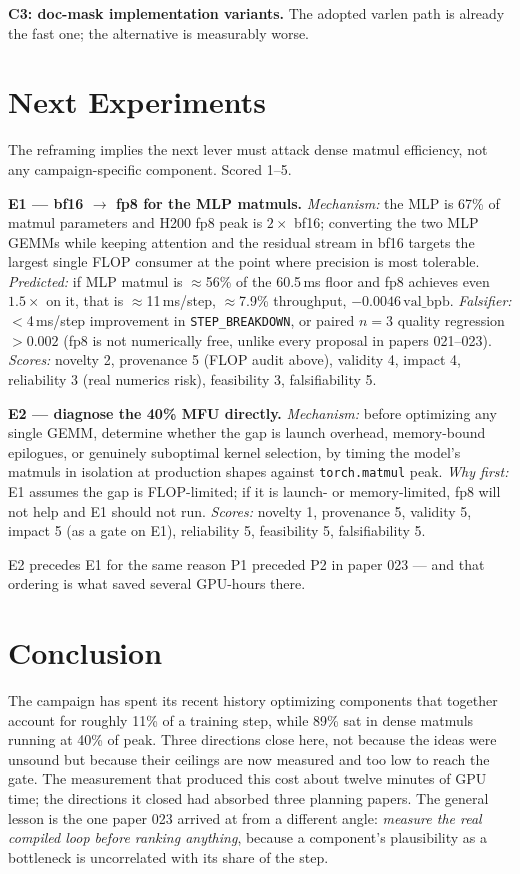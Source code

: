 \documentclass{article}
\newcommand{\vb}{\mathrm{val\_bpb}}
\begin{document}
\textbf{C3: doc-mask implementation variants.} The adopted varlen path is already the fast one; the alternative is measurably worse.

\section{Next Experiments}
The reframing implies the next lever must attack dense matmul efficiency, not any campaign-specific component. Scored 1--5.

\textbf{E1 --- bf16 $\to$ fp8 for the MLP matmuls.} \emph{Mechanism:} the MLP is 67\% of matmul parameters and H200 fp8 peak is $2\times$ bf16; converting the two MLP GEMMs while keeping attention and the residual stream in bf16 targets the largest single FLOP consumer at the point where precision is most tolerable. \emph{Predicted:} if MLP matmul is $\approx$56\% of the 60.5\,ms floor and fp8 achieves even $1.5\times$ on it, that is $\approx$11\,ms/step, $\approx$7.9\% throughput, $-0.0046$\,$\vb$. \emph{Falsifier:} $<$4\,ms/step improvement in \texttt{STEP\_BREAKDOWN}, or paired $n{=}3$ quality regression $>0.002$ (fp8 is not numerically free, unlike every proposal in papers 021--023). \emph{Scores:} novelty 2, provenance 5 (FLOP audit above), validity 4, impact 4, reliability 3 (real numerics risk), feasibility 3, falsifiability 5.

\textbf{E2 --- diagnose the 40\% MFU directly.} \emph{Mechanism:} before optimizing any single GEMM, determine whether the gap is launch overhead, memory-bound epilogues, or genuinely suboptimal kernel selection, by timing the model's matmuls in isolation at production shapes against \texttt{torch.matmul} peak. \emph{Why first:} E1 assumes the gap is FLOP-limited; if it is launch- or memory-limited, fp8 will not help and E1 should not run. \emph{Scores:} novelty 1, provenance 5, validity 5, impact 5 (as a gate on E1), reliability 5, feasibility 5, falsifiability 5.

E2 precedes E1 for the same reason P1 preceded P2 in paper 023 --- and that ordering is what saved several GPU-hours there.

\section{Conclusion}
The campaign has spent its recent history optimizing components that together account for roughly 11\% of a training step, while 89\% sat in dense matmuls running at 40\% of peak. Three directions close here, not because the ideas were unsound but because their ceilings are now measured and too low to reach the gate. The measurement that produced this cost about twelve minutes of GPU time; the directions it closed had absorbed three planning papers. The general lesson is the one paper 023 arrived at from a different angle: \emph{measure the real compiled loop before ranking anything}, because a component's plausibility as a bottleneck is uncorrelated with its share of the step.
\end{document}
